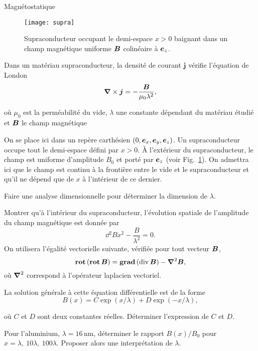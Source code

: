 \begin{td}{Magnétostatique}
\begin{figure}[h]
	\centering
	\texttt{[image: supra]}
	\caption{Supraconducteur occupant le demi-espace $x > 0$ baignant dans
	un champ magnétique uniforme $\vecb$ colinéaire à $\ez$.}%
	\label{fig:supra}
\end{figure}

	Dans un matériau supraconducteur, la densité de courant $\mathbf{j}$ 
	vérifie l'équation de London 
\begin{equation*}
	\grad \times \vecj = -\frac{\vecb}{\mu_0 \lambda^2},
\end{equation*} 

où $\mu_0$ est la perméabilité du vide, $\lambda$ une constante dépendant du 
matériau étudié et $\vecb$ le champ magnétique

On se place ici dans un repère carthésien $(0,\ex,\ey,\ez)$. 
Un supraconducteur occupe tout le demi-espace défini par $x > 0$.
À l'extérieur du supraconducteur, le champ est uniforme d'amplitude $B_0$ et 
porté par $\ez$ (voir Fig.~\ref{fig:supra}).
On admettra ici que le champ est continu à la frontière entre le vide et le 
supraconducteur et qu'il ne dépend que de $x$ à l'intérieur de ce dernier.

\begin{exlist}
	\item Faire une analyse dimensionnelle pour déterminer la dimension de $\lambda$.
	\item Montrer qu'à l'intérieur du supraconducteur, 
	  l'évolution spatiale de l'amplitude du  champ magnétique est donnée par 
		\begin{equation*}
			\dd{^2B}{x^2} - \frac{B}{\lambda^2} = 0.
		\end{equation*}
	On utilisera l'égalité vectorielle suivante, vérifiée pour tout 
	vecteur $\vecb$,
	\begin{equation*} 
		\rot(\rot \vecb) = \gradient(\div\vecb) - \laplacien \vecb,
	\end{equation*}
	où $\laplacien$ correspond à l'opérateur laplacien vectoriel.
	\item La solution générale à cette équation différentielle est de la forme 
\begin{equation}
	B(x) = C \exp(x/\lambda) + D \exp(-x/\lambda),
\end{equation}

où $C$ et $D$ sont deux constantes réelles.
Déterminer l'expression de $C$ et $D$.

\item Pour l'aluminium, $\lambda = 16$\,nm, déterminer le rapport $B(x)/B_0$ pour $x = \lambda,\ 10\lambda,\ 100\lambda$. Proposer alors une interprétation de $\lambda$.
\end{exlist}


\end{td}
